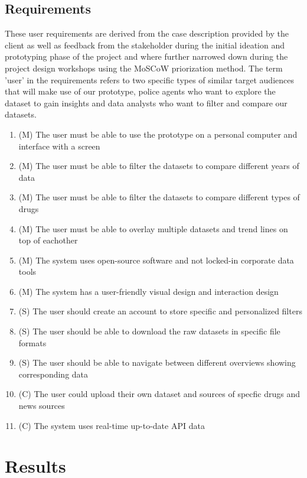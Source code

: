 \subsection{Requirements}



These user requirements are derived from the case description provided by the client as well as feedback from the stakeholder during the initial ideation and prototyping phase of the project and where further narrowed down during the project design workshops using the MoSCoW priorization method. The term 'user' in the requirements refers to two specific types of similar target audiences that will make use of our prototype, police agents who want to explore the dataset to gain insights and data analysts who want to filter and compare our datasets.

\begin{enumerate}
  \item (M) The user must be able to use the prototype on a personal computer and interface with a screen
  \item (M) The user must be able to filter the datasets to compare different years of data
  \item (M) The user must be able to filter the datasets to compare different types of drugs
  \item (M) The user must be able to overlay multiple datasets and trend lines on top of eachother
  \item (M) The system uses open-source software and not locked-in corporate data tools
  \item (M) The system has a user-friendly visual design and interaction design
  \item (S) The user should create an account to store specific and personalized filters
  \item (S) The user should be able to download the raw datasets in specific file formats
  \item (S) The user should be able to navigate between different overviews showing corresponding data
  \item (C) The user could upload their own dataset and sources of specfic drugs and news sources
  \item (C) The system uses real-time up-to-date API data
\end{enumerate}

\section{Results}


